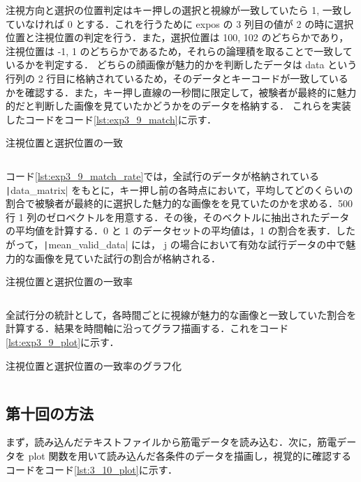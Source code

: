 \documentclass[dvipdfmx, titlepage, t]{jsarticle}
\begin{document}
    注視方向と選択の位置判定はキー押しの選択と視線が一致していたら 1, 一致していなければ 0 とする．これを行うために expos の 3 列目の値が 2 の時に選択位置と注視位置の判定を行う．また，選択位置は 100, 102 のどちらかであり，注視位置は -1, 1 のどちらかであるため，それらの論理積を取ることで一致しているかを判定する． どちらの顔画像が魅力的かを判断したデータは data という行列の 2 行目に格納されているため，そのデータとキーコードが一致しているかを確認する．また，キー押し直線の一秒間に限定して，被験者が最終的に魅力的だと判断した画像を見ていたかどうかをのデータを格納する．
    これらを実装したコードをコード\ref{lst:exp3_9_match}に示す．
    \begin{program}[H]
        \caption{注視位置と選択位置の一致}
        \inputminted[linenos,
        firstline=60,
        lastline=76,
        frame=lines,
        fontsize = \small]{matlab}{code/Exp3_9_Matlab.m}
        \label{lst:exp3_9_match}
    \end{program}
    コード\ref{lst:exp3_9_match_rate}では，全試行のデータが格納されている \texttt|data_matrix| をもとに，キー押し前の各時点において，平均してどのくらいの割合で被験者が最終的に選択した魅力的な画像をを見ていたのかを求める．500 行 1 列のゼロベクトルを用意する．その後，そのベクトルに抽出されたデータの平均値を計算する．0 と 1 のデータセットの平均値は，1 の割合を表す．したがって，\texttt|mean_valid_data| には， j の場合において有効な試行データの中で魅力的な画像を見ていた試行の割合が格納される．
    \begin{program}[H]
        \caption{注視位置と選択位置の一致率}
        \inputminted[linenos,
        firstline=79,
        lastline=91,
        frame=lines,
        fontsize = \small]{matlab}{code/Exp3_9_Matlab.m}
        \label{lst:exp3_9_match_rate}
    \end{program}

    全試行分の統計として，各時間ごとに視線が魅力的な画像と一致していた割合を計算する．結果を時間軸に沿ってグラフ描画する．これをコード\ref{lst:exp3_9_plot}に示す．
    \begin{program}[H]
        \caption{注視位置と選択位置の一致率のグラフ化}
        \inputminted[linenos,
        firstline=92,
        lastline=96,
        frame=lines,
        fontsize = \small]{matlab}{code/Exp3_9_Matlab.m}
        \label{lst:exp3_9_plot}
    \end{program}

    \subsection{第十回の方法}
    まず，読み込んだテキストファイルから筋電データを読み込む．次に，筋電データを plot 関数を用いて読み込んだ各条件のデータを描画し，視覚的に確認するコードをコード\ref{lst:3_10_plot}に示す．
\end{document}
